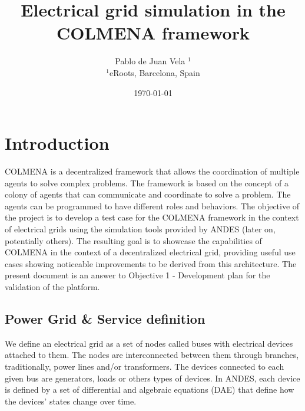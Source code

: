 \documentclass{article}
\title{Electrical grid simulation in the COLMENA framework}
\author{Pablo de Juan Vela $^{1}$ \\
        \small $^{1}$eRoots, Barcelona, Spain \\
}
\date{\today}
\begin{document}
\maketitle

\section{Introduction}
COLMENA is a decentralized framework that allows the coordination of multiple agents to solve complex problems. The framework is based on the concept of a colony of agents that can communicate and coordinate to solve a problem. The agents can be programmed to have different roles and behaviors. The objective of the project is to develop a test case for the COLMENA framework in the context of electrical grids using the simulation tools provided by ANDES \cite{grids:models}(later on, potentially others). The resulting goal is to showcase the capabilities of COLMENA in the context of a decentralized electrical grid, providing useful use cases showing noticeable improvements to be derived from this architecture. The present document is an answer to Objective 1 - Development plan for the validation of the platform.




\subsection{Power Grid \& Service definition}
We define an electrical grid as a set of nodes called buses with electrical devices attached to them. The nodes are interconnected between them through branches, traditionally, power lines and/or transformers. The devices connected to each given bus are generators, loads or others types of devices. In ANDES, each device is defined by a set of differential and algebraic equations (DAE) that define how the devices' states change over time.


\end{document}
